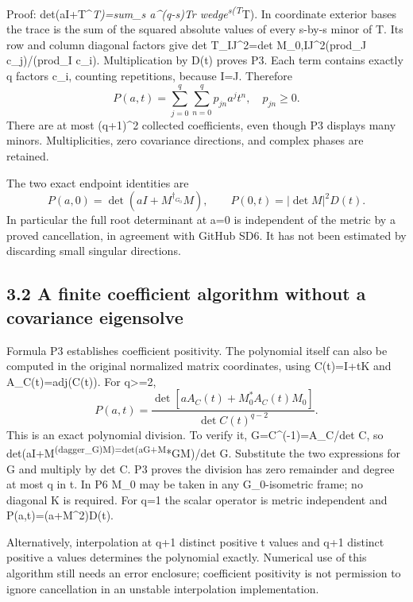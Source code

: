 Proof: det(aI+T\^{}\emph{T)=sum\_s a\^{}(q-s)Tr wedge\textsuperscript{s(T}}T). In coordinate exterior bases the trace is the sum of the squared absolute values of every s-by-s minor of T. Its row and column diagonal factors give \textbar det T\_IJ\textbar\^{}2=\textbar det M\_0,IJ\textbar\^{}2(prod\_J c\_j)/(prod\_I c\_i). Multiplication by D(t) proves P3. Each term contains exactly q factors c\_i, counting repetitions, because \textbar I\textbar=\textbar J\textbar. Therefore \[
 \boxed{P(a,t)=\sum_{j=0}^q\sum_{n=0}^q p_{jn}a^jt^n,
 \quad p_{jn}\ge0.}\tag{P4}
\] There are at most (q+1)\^{}2 collected coefficients, even though P3 displays many minors. Multiplicities, zero covariance directions, and complex phases are retained.

The two exact endpoint identities are \[
 P(a,0)=\det(aI+M^{\dagger_{G_0}}M),\qquad
 P(0,t)=|\det M|^2D(t).
 \tag{P5}
\] In particular the full root determinant at a=0 is independent of the metric by a proved cancellation, in agreement with GitHub SD6. It has not been estimated by discarding small singular directions.

\subsection{3.2 A finite coefficient algorithm without a covariance eigensolve}\label{a-finite-coefficient-algorithm-without-a-covariance-eigensolve}

Formula P3 establishes coefficient positivity. The polynomial itself can also be computed in the original normalized matrix coordinates, using C(t)=I+tK and A\_C(t)=adj(C(t)). For q\textgreater=2, \[
 \boxed{P(a,t)=
 \frac{\det[aA_C(t)+M_0^*A_C(t)M_0]}
      {\det C(t)^{q-2}}.}\tag{P6}
\] This is an exact polynomial division. To verify it, G=C\^{}(-1)=A\_C/det C, so det(aI+M\textsuperscript{(dagger\_G)M)=det(aG+M}*GM)/det G. Substitute the two expressions for G and multiply by det C. P3 proves the division has zero remainder and degree at most q in t. In P6 M\_0 may be taken in any G\_0-isometric frame; no diagonal K is required. For q=1 the scalar operator is metric independent and P(a,t)=(a+\textbar M\textbar\^{}2)D(t).

Alternatively, interpolation at q+1 distinct positive t values and q+1 distinct positive a values determines the polynomial exactly. Numerical use of this algorithm still needs an error enclosure; coefficient positivity is not permission to ignore cancellation in an unstable interpolation implementation.

